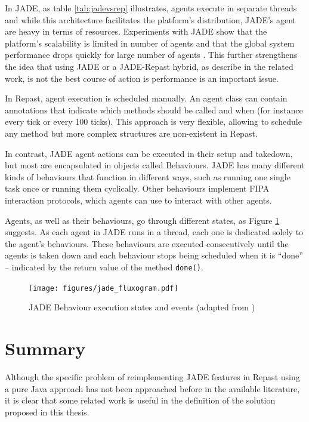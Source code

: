 In JADE, as table \ref{tab:jadevsrep} illustrates, agents execute in separate threads and while this architecture facilitates the platform's distribution, JADE's agent are heavy in terms of resources. Experiments with JADE show that the platform's scalability is limited in number of agents and that the global system performance drops quickly for large number of agents \cite{mengistu2008scalability} \cite{garcia2011misia}. This further strengthens the idea that using JADE or a JADE-Repast hybrid, as describe in the related work, is not the best course of action is performance is an important issue.

In Repast, agent execution is scheduled manually. An agent class can contain annotations that indicate which methods should be called and when (for instance every tick or every 100 ticks). This approach is very flexible, allowing to schedule any method but more complex structures are non-existent in Repast.

In contrast, JADE agent actions can be executed in their setup and takedown, but most are encapsulated in objects called Behaviours. JADE has many different kinds of behaviours that function in different ways, such as running one single task once or running them cyclically. Other behaviours implement FIPA interaction protocols, which agents can use to interact with other agents.

Agents, as well as their behaviours, go through different states, as Figure \ref{fig:jade_fluxogram} suggests. As each agent in JADE runs in a thread, each one is dedicated solely to the agent's behaviours. These behaviours are executed consecutively until the agents is taken down and each behaviour stops being scheduled when it is ``done'' -- indicated by the return value of the method \texttt{done()}.

\begin{figure}[h]
	\centering
	\texttt{[image: figures/jade\_fluxogram.pdf]}
	\caption[JADE Behaviour execution states]{JADE Behaviour execution states and events (adapted from \cite{bellifemine2007developing})}
	\label{fig:jade_fluxogram}
\end{figure}



\section{Summary}
Although the specific problem of reimplementing JADE features in Repast using a pure Java approach has not been approached before in the available literature, it is clear that some related work is useful in the definition of the solution proposed in this thesis. 

